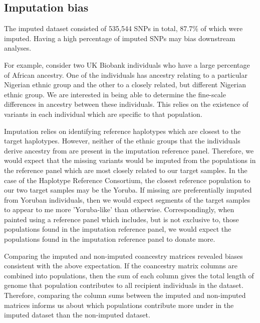 \subsection{Imputation bias}

The imputed dataset consisted of 535,544 SNPs in total, 87.7\% of which were imputed. Having a high percentage of imputed SNPs may bias downstream analyses. 

For example, consider two UK Biobank individuals who have a large percentage of African ancestry. One of the individuals has ancestry relating to a particular Nigerian ethnic group and the other to a closely related, but different Nigerian ethnic group. We are interested in being able to determine the fine-scale differences in ancestry between these individuals. This relies on the existence of variants in each individual which are specific to that population.

Imputation relies on identifying reference haplotypes which are closest to the target haplotypes. However, neither of the ethnic groups that the individuals derive ancestry from are present in the imputation reference panel. Therefore, we would expect that the missing variants would be imputed from the populations in the reference panel which are most closely related to our target samples. In the case of the Haplotype Reference Consortium, the closest reference population to our two target samples may be the Yoruba. If missing are preferentially imputed from Yoruban individuals, then we would expect segments of the target samples to appear to me more 'Yoruba-like' than otherwise. Correspondingly, when painted using a reference panel which includes, but is not exclusive to, those populations found in the imputation reference panel, we would expect the populations found in the imputation reference panel to donate more.

Comparing the imputed and non-imputed coancestry matrices revealed biases consistent with the above expectation. If the coancestry matrix columns are combined into populations, then the sum of each column gives the total length of genome that population contributes to all recipient individuals in the dataset. Therefore, comparing the column sums between the imputed and non-imputed matrices informs us about which populations contribute more under in the imputed dataset than the non-imputed dataset. 

